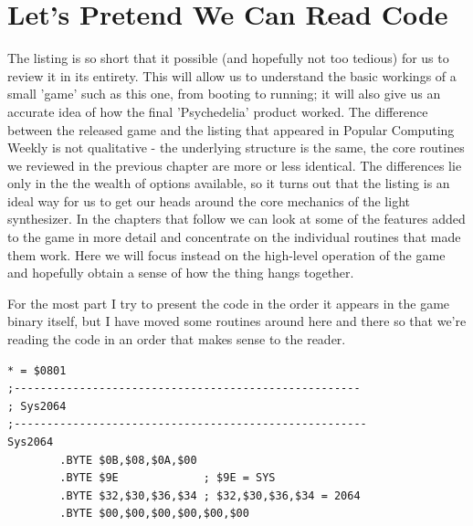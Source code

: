 \chapter{Let's Pretend We Can Read Code} 
\lstset{style=6502Style}
The listing is so short that it possible (and hopefully not too tedious) for us to
review it in its entirety. This will allow us to understand the basic workings of 
a small 'game' such as this one, from booting to running; it will also give us an
accurate idea of how the final 'Psychedelia' product worked. The difference between
the released game and the listing that appeared in Popular Computing Weekly is not
qualitative - the underlying structure is the same, the core routines we reviewed 
in the previous chapter are more or less identical. The differences lie only in the
the wealth of options available, so it turns out that the listing is an ideal way
for us to get our heads around the core mechanics of the light synthesizer. In the
chapters that follow we can look at some of the features added to the game in more
detail and concentrate on the individual routines that made them work. Here we will
focus instead on the high-level operation of the game and hopefully obtain a sense
of how the thing hangs together.

For the most part I try to present the code in the order it appears in the game
binary itself, but I have moved some routines around here and there so that we're
reading the code in an order that makes sense to the reader.

\clearpage
\begin{lstlisting}[caption=The bootstrap routine common to nearly every C64 program]
* = $0801
;-----------------------------------------------------
; Sys2064
;------------------------------------------------------
Sys2064
        .BYTE $0B,$08,$0A,$00
        .BYTE $9E             ; $9E = SYS
        .BYTE $32,$30,$36,$34 ; $32,$30,$36,$34 = 2064
        .BYTE $00,$00,$00,$00,$00,$00
\end{lstlisting}

